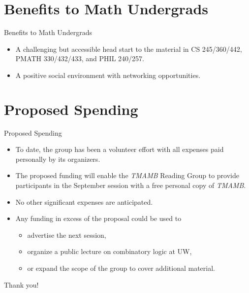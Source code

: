 \documentclass{beamer}
\begin{document}
\section{Benefits to Math Undergrads}
\begin{frame}{Benefits to Math Undergrads}
  \begin{itemize}
  \pause
    \item A challenging but accessible head start to the material in CS 245/360/442, PMATH 330/432/433, and PHIL 240/257. \pause
    \item A positive social environment with networking opportunities. 
  \end{itemize}
\end{frame}

\section{Proposed Spending}
\begin{frame}{Proposed Spending}
  \begin{itemize}
  \pause
    \item To date, the group has been a volunteer effort with all expenses paid personally by its organizers. \pause
    \item The proposed funding will enable the \emph{TMAMB} Reading Group to provide participants in the September session with a free personal copy of \emph{TMAMB}. \pause
    \item No other significant expenses are anticipated. \pause
    \item Any funding in excess of the proposal could be used to \begin{itemize} \item advertise the next session, \item organize a public lecture on combinatory logic at UW, \item or expand the scope of the group to cover additional material. \end{itemize}
  \end{itemize}
\end{frame}

\begin{frame}{}
  \begin{center}
  \Large Thank you!
  \end{center}
\end{frame}
\end{document}
